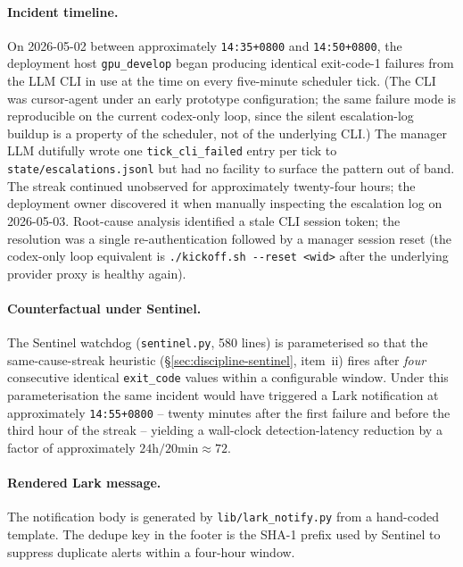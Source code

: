 \paragraph{Incident timeline.}
On 2026-05-02 between approximately \texttt{14:35+0800} and
\texttt{14:50+0800}, the deployment host \texttt{gpu\_develop} began
producing identical exit-code-1 failures from the LLM CLI in use at
the time on every five-minute scheduler tick. (The CLI was
cursor-agent under an early prototype configuration; the same failure
mode is reproducible on the current codex-only loop, since the silent
escalation-log buildup is a property of the scheduler, not of the
underlying CLI.) The manager LLM dutifully wrote one
\texttt{tick\_cli\_failed} entry per tick to
\texttt{state/escalations.jsonl} but had no facility to surface the
pattern out of band. The streak continued unobserved for
approximately twenty-four hours; the deployment owner discovered it
when manually inspecting the escalation log on 2026-05-03.
Root-cause analysis identified a stale CLI session token; the
resolution was a single re-authentication followed by a manager
session reset (the codex-only loop equivalent is
\texttt{./kickoff.sh -{}-reset <wid>} after the underlying provider
proxy is healthy again).

\paragraph{Counterfactual under Sentinel.}
The Sentinel watchdog (\texttt{sentinel.py}, 580 lines) is
parameterised so that the same-cause-streak heuristic
(\S\ref{sec:discipline-sentinel}, item~ii) fires after
\textit{four} consecutive identical \texttt{exit\_code} values within
a configurable window. Under this parameterisation the same incident
would have triggered a Lark notification at approximately
\texttt{14:55+0800} -- twenty minutes after the first failure and
before the third hour of the streak -- yielding a wall-clock
detection-latency reduction by a factor of approximately
\(24 \text{h} / 20 \text{min} \approx 72\).

\paragraph{Rendered Lark message.}
The notification body is generated by \texttt{lib/lark\_notify.py}
from a hand-coded template. The dedupe key in the footer is the
SHA-1 prefix used by Sentinel to suppress duplicate alerts within a
four-hour window.

